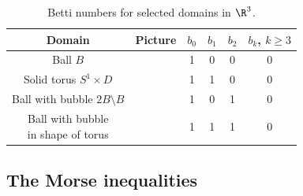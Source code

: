 \begin{table}
  \centering
  \renewcommand{\arraystretch}{3}
  \begin{tabular}{c|c|c|c|c|c}
    Domain & Picture & $b_0$ & $b_1$ & $b_2$ & $b_k$, $k\geq3$ \\ \hline
    Ball $B$ & 
    \begin{minipage}{0.1\textwidth}
      \def\svgwidth{\textwidth}
      
    \end{minipage}
    & 1 & 0 & 0 & 0 \\
    Solid torus $S^1\times D$ & 
    \begin{minipage}{0.1\textwidth}
      \def\svgwidth{\textwidth}
      
    \end{minipage}
    & 1 & 1 & 0 & 0 \\
    Ball with bubble $2B\setminus B$ & 
    \begin{minipage}{0.1\textwidth}
      \def\svgwidth{\textwidth}
      
    \end{minipage}
    & 1 & 0 & 1 & 0 \\
    \makecell{Ball with bubble \\in shape of torus} & 
    \begin{minipage}{0.1\textwidth}
      \def\svgwidth{\textwidth}
      
    \end{minipage}
    & 1 & 1 & 1 & 0 \\
  \end{tabular}
  \caption{Betti numbers for selected domains in $\R^3$.}
  \label{tb:n3_domains_bettiNbrs}
\end{table}


\subsection{The Morse inequalities}

